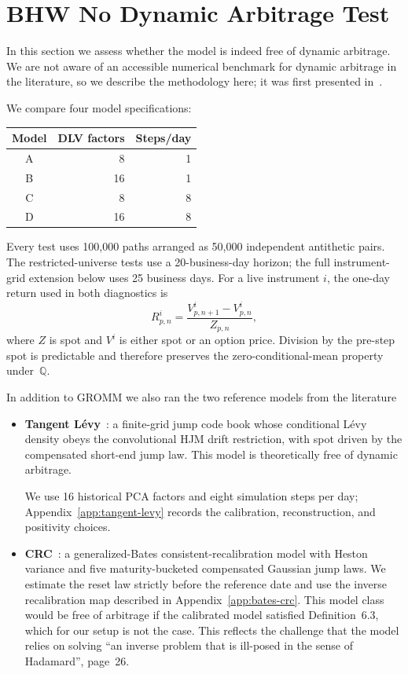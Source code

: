 \documentclass[11pt]{article}
\newcommand{\Q}{\mathbb Q}
\theoremstyle{plain}
\theoremstyle{definition}
\theoremstyle{remark}
\begin{document}
\section{BHW No Dynamic Arbitrage Test}\label{sec:numerics}

In this section we assess whether the model is indeed free of dynamic arbitrage.
We are not aware of an accessible numerical benchmark for dynamic arbitrage in the literature, so
we describe the methodology here; it was first presented in~\cite{DYSANOS2026}.

We compare four model specifications:
\begin{center}
\begin{tabular}{crr}
\toprule
Model & DLV factors & Steps/day\\
\midrule
A & 8  & 1\\
B & 16 & 1\\
C & 8  & 8\\
D & 16 & 8\\
\bottomrule
\end{tabular}
\end{center}
Every test uses 100,000 paths arranged as 50,000 independent antithetic
pairs.  The restricted-universe tests use a 20-business-day horizon; the full
instrument-grid extension below uses 25 business days.  For a live instrument $i$, the
one-day return used in both diagnostics is
\begin{equation}\label{eq:numerics-spot-scaled-return}
  R_{p,n}^i
  =\frac{V_{p,n+1}^i-V_{p,n}^i}{Z_{p,n}},
\end{equation}
where $Z$ is spot and $V^i$ is either spot or an option price.  Division by the
pre-step spot is predictable and therefore preserves the zero-conditional-mean
property under~$\Q$.

In addition to GROMM we also ran the two reference models from the literature
\begin{itemize}
  \item \textbf{Tangent L\'evy}~\citep{TangentLevy}: a finite-grid jump code book
  whose conditional L\'evy density obeys the convolutional HJM drift restriction,
  with spot driven by the compensated short-end jump law. This model is theoretically
  free of dynamic arbitrage.

  We use 16 historical
  PCA factors and eight simulation steps per day; Appendix~\ref{app:tangent-levy}
  records the calibration, reconstruction, and positivity choices.

  \item \textbf{CRC}~\citep{DysLitGambaraTeichmann2021}: a generalized-Bates
  consistent-recalibration model with Heston variance and five
  maturity-bucketed compensated Gaussian jump laws.  We estimate the reset
  law strictly before the reference date and use the inverse recalibration
  map described in Appendix~\ref{app:bates-crc}. This model class would be free of arbitrage
  if the calibrated model satisfied Definition~6.3, which for our setup is
  not the case. This reflects the challenge that the model relies on solving
  ``an inverse problem that is ill-posed in the sense of Hadamard'', page~26.
\end{itemize}
\end{document}
